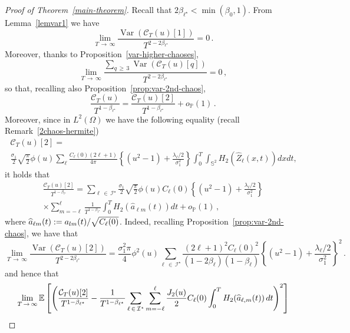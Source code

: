 \documentclass[10pt]{amsart}
\theoremstyle{definition}\newtheorem{defi}[theo]{Definition}\newtheorem{rema}[theo]{Remark}\newtheorem{exam}[theo]{Example}\newtheorem{exem}[theo]{Example}\newtheorem{nota}[theo]{Notation}
\newcommand{\clI}{\mathcal{I}}
\newcommand{\clC}{\mathcal{C}}
\newcommand{\bbS}{\mathbb{S}}
\newcommand{\bbP}{\mathbb{P}}
\DeclareMathOperator{\Var}{Var}
\let\oldhat\hat
\renewcommand*{\hat}[1]{\mathchoice{\widehat{#1}}{\widehat{#1}}{\oldhat{#1}}{\oldhat{#1}}}
\begin{document}
\begin{proof}[Proof of Theorem~\ref{main-theorem}]
Recall that $2\beta_{\ell^\star}<\min(\beta_0,1)$. From Lemma~\ref{lemvar1} we have
\[
\lim_{T\,\to\,\infty} \frac{\Var(\clC_T(u)[1])}{T^{2-2\beta_{\ell^\star}}} = 0\,.
\]
Moreover, thanks to Proposition~\ref{var-higher-chaoses},
\[
\lim_{T\,\to\,\infty} \frac{\sum_{q\,\ge\,3} \Var(\clC_T(u)[q])}{T^{2-2\beta_{\ell^\star}}} = 0\,,
\]
so that, recalling also Proposition~\ref{prop:var-2nd-chaos},
\begin{equation}\label{2chaosA}
\frac{\clC_T(u)}{T^{1-\beta_{\ell^\star}}}=\frac{\clC_T(u)[2]}{T^{1-\beta_{\ell^\star}}}+o_{\bbP}(1)\,.
\end{equation}
Moreover, since in $L^2(\Omega)$ we have the following equality (recall Remark~\ref{2chaos-hermite})
\begin{multline*}
\clC_T(u)[2]=\\
\frac{\sigma _{1}}{2}\sqrt{\frac{\pi }{2}}
\phi (u)\sum_{\ell} \frac{C_{\ell }(0)(2\ell +1)}{4\pi } \left\{\left(u^{2}-1\right)+\frac{\lambda _{\ell }/2}{
\sigma_{1}^{2}}\right\} \int_0^T\int_{\bbS^{2}}H_{2}\left(\widehat Z_{\ell}(x,t)\right)dxdt\text{,}
\end{multline*}
it holds that
\begin{multline} \label{eq:var2spectral}
\frac{\clC_T(u)[2]}{T^{1-\beta_{\ell^\star}}}=
\sum_{\ell\,\in\,\clI^\star} \frac{\sigma_1}{2}\sqrt{\frac\pi2} \phi(u) C_\ell(0) \left\{\left(u^{2}-1\right)+\frac{\lambda_{\ell}/2}{\sigma_{1}^{2}}\right\}\\
\times \sum_{m=-\ell}^{\ell} \frac{1}{T^{1-\beta_{\ell^\star}}}\int_{0}^T H_2\left(\widehat a_{\ell m}(t)\right)dt +o_{\bbP}(1)\,,
\end{multline}
where $\hat a_{\ell m}(t):= a_{l m}(t) / \sqrt{C_\ell(0)}$. Indeed, recalling Proposition~\ref{prop:var-2nd-chaos}, we have that
\begin{equation}\label{th21}
\lim_{T\,\rightarrow\,\infty }\frac{\Var\left(\clC_{T}(u)[2]\right) }{T^{2-2\beta_{\ell^{\star}}}} =\frac{
\sigma_{1}^{2}\pi }{4}\phi^{2}(u)\sum_{\ell\,\in\,\clI^\star}\frac{(2\ell+1)^{2}C_\ell(0)^2}{(1-2\beta_\ell)(1-\beta_\ell)}
\left\{\left(u^{2}-1\right)+\frac{\lambda _{\ell}/2}{\sigma_{1}^{2}}\right\}^2\,.
\end{equation}
and hence that
\begin{multline*}
\lim_{T\,\to\,\infty}\mathbb E\left[\left(\frac{\clC_T(u)[2]}{T^{1-\beta_{\ell^\star}}} -\frac{1}{T^{1-\beta_{\ell^\star}}}\sum_{\ell\,\in\,\clI^\star}\sum_{m=-\ell}^\ell \frac{J_2(u)}{2} C_\ell(0)\int_0^T H_2(\hat a_{\ell, m}(t))\, dt \right)^2\right]\\

\end{multline*}
\end{proof}
\end{document}
